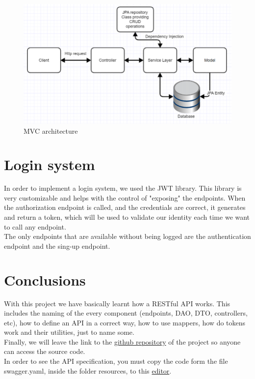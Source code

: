 \documentclass[12pt, letterpaper]{article}
\begin{document}
\begin{figure}[!htbp]
    \includegraphics[scale=0.5]{mvc.png}
    \centering
    \caption{MVC architecture}
    \label{mvc}
\end{figure}

\newpage




\section{Login system}
In order to implement a login system, we used the JWT library. This library is very customizable and helps with the control of "exposing" the endpoints. When the authorization endpoint is called, and the credentials are correct, it generates and return a token, which will be used to validate our identity each time we want to call any endpoint. \\

The only endpoints that are available without being logged are the authentication endpoint and the sing-up endpoint.

\section{Conclusions}
With this project we have basically learnt how a RESTful API works. This includes the naming of the every component (endpoints, DAO, DTO, controllers, etc), how to define an API in a correct way, how to use mappers, how do tokens work and their utilities, just to name some. \\

Finally, we will leave the link to the \href{https://github.com/RogerFontovaTorres/iot-rest}{github repository} of the project so anyone can access the source code. \\

In order to see the API specification, you must copy the code form the file swagger.yaml, inside the folder resources, to this \href{https://editor.swagger.io/}{editor}.
\end{document}
